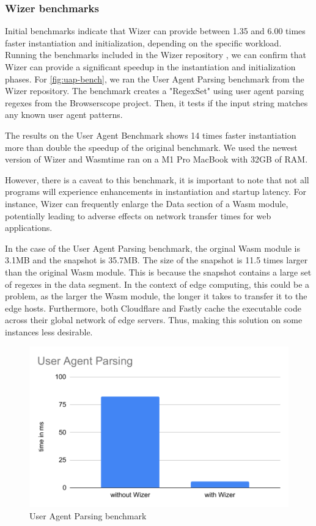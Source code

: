 \subsubsection{Wizer benchmarks}
\label{sec:wizer-benchmarks}

Initial benchmarks indicate that Wizer can provide between 1.35 and 6.00 times faster instantiation and initialization, depending on the specific workload. Running the benchmarks included in the Wizer repository \cite{bytecodealliance_2023_wizer}, we can confirm that Wizer can provide a significant speedup in the instantiation and initialization phases. For \autoref{fig:uap-bench}, we ran the User Agent Parsing benchmark from the Wizer repository. The benchmark creates a "RegexSet" using user agent parsing regexes from the Browserscope project. Then, it tests if the input string matches any known user agent patterns. 

The results on the User Agent Benchmark shows 14 times faster instantiation more than double the speedup of the original benchmark. We used the newest version of Wizer and Wasmtime ran on a M1 Pro MacBook with 32GB of RAM.

However, there is a caveat to this benchmark, it is important to note that not all programs will experience enhancements in instantiation and startup latency. For instance, Wizer can frequently enlarge the Data section of a Wasm module, potentially leading to adverse effects on network transfer times for web applications. 

In the case of the User Agent Parsing benchmark, the orginal Wasm module is 3.1MB and the snapshot is 35.7MB. The size of the snapshot is 11.5 times larger than the original Wasm module. This is because the snapshot contains a large set of regexes in the data segment.
In the context of \gls{edge computing}, this could be a problem, as the larger the Wasm module, the longer it takes to transfer it to the edge hosts. Furthermore, both Cloudflare and Fastly cache the executable code across their global network of edge servers. Thus, making this solution on some instances less desirable. 

\begin{figure}[H]
	\centering
	\includegraphics[width=0.6\linewidth]{images/runtimes/UAP.pdf}
	\caption{User Agent Parsing benchmark}
	\label{fig:uap-bench}
\end{figure}
